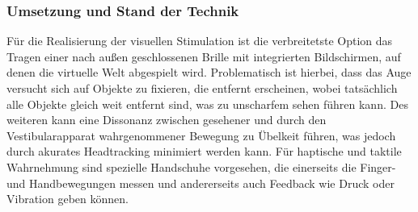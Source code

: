 \documentclass[12pt,a4paper,bibliography=totocnumbered,listof=totocnumbered]{scrartcl}
\begin{document}
\subsubsection{Umsetzung und Stand der Technik}
Für die Realisierung der visuellen Stimulation ist die verbreitetste Option das Tragen einer nach außen geschlossenen Brille mit integrierten Bildschirmen, auf denen die virtuelle Welt abgespielt wird. Problematisch ist hierbei, dass das Auge versucht sich auf Objekte zu fixieren, die entfernt erscheinen, wobei tatsächlich alle Objekte gleich weit entfernt sind, was zu unscharfem sehen führen kann. Des weiteren kann eine Dissonanz zwischen gesehener und durch den Vestibularapparat wahrgenommener Bewegung zu Übelkeit führen, was jedoch durch akurates Headtracking minimiert werden kann. Für haptische und taktile Wahrnehmung sind spezielle Handschuhe vorgesehen, die einerseits die Finger- und Handbewegungen messen und andererseits auch Feedback wie Druck oder Vibration geben können.%
\end{document}
